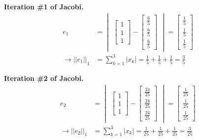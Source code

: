 \documentclass[12pt]{article}
\begin{document}
\textbf{Iteration \#1 of Jacobi.}
\begin{align*}
    e_1 &= \begin{vmatrix}\begin{bmatrix} 1 \\[1.5ex] 1 \\[1.5ex] 1 \end{bmatrix} - 
    \begin{bmatrix}
        \frac{6}{5} \\[1.5ex]
        \frac{6}{5} \\[1.5ex]
        \frac{6}{5}
    \end{bmatrix} \end{vmatrix}
    = \begin{bmatrix}
        \frac{1}{5} \\[1.5ex]
        \frac{1}{5} \\[1.5ex]
        \frac{1}{5}
    \end{bmatrix} \\
    \longrightarrow ||e_1||_1 &= \sum_{k=1}^3 |x_k| = \frac{1}{5} + \frac{1}{5} + \frac{1}{5} = \frac{3}{5}
\end{align*}

\textbf{Iteration \#2 of Jacobi.}
\begin{align*}
    e_2 &= \begin{vmatrix}\begin{bmatrix} 1 \\[1.5ex] 1 \\[1.5ex] 1 \end{bmatrix} - 
    \begin{bmatrix}
        \frac{24}{25} \\[1.5ex]
        \frac{24}{25} \\[1.5ex]
        \frac{24}{25}
    \end{bmatrix} \end{vmatrix}
    = \begin{bmatrix}
        \frac{1}{25} \\[1.5ex]
        \frac{1}{25} \\[1.5ex]
        \frac{1}{25}
    \end{bmatrix} \\
    \longrightarrow ||e_2||_1 &= \sum_{k=1}^3 |x_k| = \frac{1}{25} + \frac{1}{25} + \frac{1}{25} = \frac{3}{25}
\end{align*}
\end{document}
